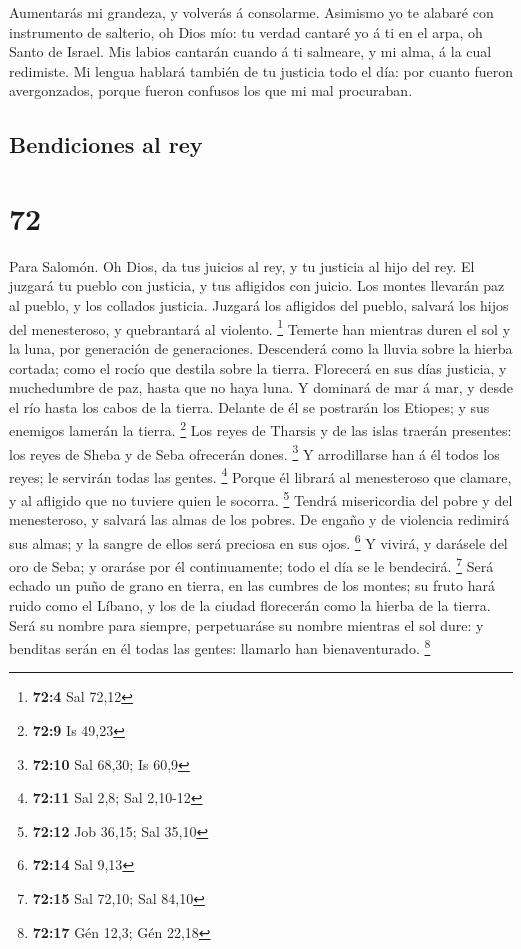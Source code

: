  Aumentarás mi grandeza, y volverás á consolarme.
 Asimismo yo te alabaré con instrumento de salterio, oh
Dios mío: tu verdad cantaré yo á ti en el arpa, oh Santo de Israel.
 Mis labios cantarán cuando á ti salmeare, y mi alma, á la
cual redimiste.  Mi lengua hablará también de tu justicia
todo el día: por cuanto fueron avergonzados, porque fueron confusos los
que mi mal procuraban.

\hypertarget{bendiciones-al-rey}{%
\subsection{Bendiciones al rey}\label{bendiciones-al-rey}}

\hypertarget{section-71}{%
\section{72}\label{section-71}}

 Para Salomón. Oh Dios, da tus juicios al rey, y tu justicia
al hijo del rey.  El juzgará tu pueblo con justicia, y tus
afligidos con juicio.  Los montes llevarán paz al pueblo, y
los collados justicia.  Juzgará los afligidos del pueblo,
salvará los hijos del menesteroso, y quebrantará al violento.
\footnote{\textbf{72:4} Sal 72,12}  Temerte han mientras
duren el sol y la luna, por generación de generaciones. 
Descenderá como la lluvia sobre la hierba cortada; como el rocío que
destila sobre la tierra.  Florecerá en sus días justicia, y
muchedumbre de paz, hasta que no haya luna.  Y dominará de
mar á mar, y desde el río hasta los cabos de la tierra. 
Delante de él se postrarán los Etiopes; y sus enemigos lamerán la
tierra. \footnote{\textbf{72:9} Is 49,23}  Los reyes de
Tharsis y de las islas traerán presentes: los reyes de Sheba y de Seba
ofrecerán dones. \footnote{\textbf{72:10} Sal 68,30; Is 60,9}
 Y arrodillarse han á él todos los reyes; le servirán todas
las gentes. \footnote{\textbf{72:11} Sal 2,8; Sal 2,10-12} 
Porque él librará al menesteroso que clamare, y al afligido que no
tuviere quien le socorra. \footnote{\textbf{72:12} Job 36,15; Sal 35,10}
 Tendrá misericordia del pobre y del menesteroso, y salvará
las almas de los pobres.  De engaño y de violencia redimirá
sus almas; y la sangre de ellos será preciosa en sus ojos. \footnote{\textbf{72:14}
  Sal 9,13}  Y vivirá, y darásele del oro de Seba; y
oraráse por él continuamente; todo el día se le bendecirá. \footnote{\textbf{72:15}
  Sal 72,10; Sal 84,10}  Será echado un puño de grano en
tierra, en las cumbres de los montes; su fruto hará ruido como el
Líbano, y los de la ciudad florecerán como la hierba de la tierra.
 Será su nombre para siempre, perpetuaráse su nombre
mientras el sol dure: y benditas serán en él todas las gentes: llamarlo
han bienaventurado. \footnote{\textbf{72:17} Gén 12,3; Gén 22,18}

